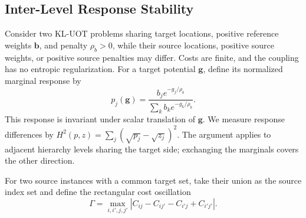 \subsection{Inter-Level Response Stability}
\label{app:uot-hierarchy-stability}

Consider two KL-UOT problems sharing target locations, positive reference weights $\mathbf b$, and penalty $\rho_b>0$, while their source locations, positive source weights, or positive source penalties may differ.
Costs are finite, and the coupling has no entropic regularization.
For a target potential $\mathbf g$, define its normalized marginal response by
\begin{equation*}
p_j(\mathbf g)=\frac{b_j e^{-g_j/\rho_b}}{\sum_k b_k e^{-g_k/\rho_b}}.
\end{equation*}
This response is invariant under scalar translation of $\mathbf g$.
We measure response differences by $H^2(p,z)=\sum_j(\sqrt{p_j}-\sqrt{z_j})^2$.
The argument applies to adjacent hierarchy levels sharing the target side; exchanging the marginals covers the other direction.

For two source instances with a common target set, take their union as the source index set and define the rectangular cost oscillation
$$\Gamma=\max_{i,i',j,j'}|C_{ij}-C_{ij'}-C_{i'j}+C_{i'j'}|.$$

